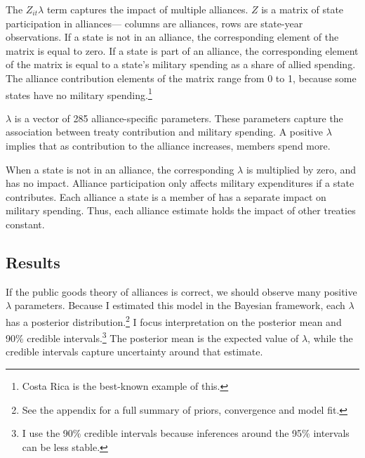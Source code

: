 \documentclass[12pt]{article}
\begin{document}
The $Z_{it} \lambda$ term captures the impact of multiple alliances. 
$Z$ is a matrix of state participation in alliances--- columns are alliances, rows are state-year observations. 
If a state is not in an alliance, the corresponding element of the matrix is equal to zero. 
If a state is part of an alliance, the corresponding element of the matrix is equal to a state's military spending as a share of allied spending. 
The alliance contribution elements of the matrix range from 0 to 1, because some states have no military spending.\footnote{Costa Rica is the best-known example of this.} 


$\lambda$ is a vector of 285 alliance-specific parameters.  
These parameters capture the association between treaty contribution and military spending. 
A positive $\lambda$ implies that as contribution to the alliance increases, members spend more. 


When a state is not in an alliance, the corresponding $\lambda$ is multiplied by zero, and has no impact. 
Alliance participation only affects military expenditures if a state contributes. 
Each alliance a state is a member of has a separate impact on military spending.
Thus, each alliance estimate holds the impact of other treaties constant.     


\subsection{Results} 


If the public goods theory of alliances is correct, we should observe many positive $\lambda$ parameters. 
Because I estimated this model in the Bayesian framework, each $\lambda$ has a posterior distribution.\footnote{See the appendix for a full summary of priors, convergence and model fit.} 
I focus interpretation on the posterior mean and 90\% credible intervals.\footnote{I use the 90\% credible intervals because inferences around the 95\% intervals can be less stable.}
The posterior mean is the expected value of $\lambda$, while the credible intervals capture uncertainty around that estimate.  
\end{document}
